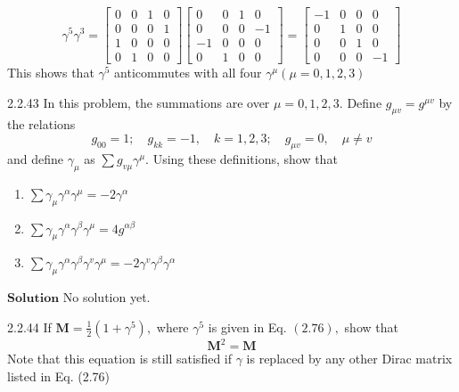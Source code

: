 $$
\gamma^{5} \gamma^{3}=\begin{bmatrix}
0 & 0 & 1 & 0 \\
0 & 0 & 0 & 1 \\
1 & 0 & 0 & 0 \\
0 & 1 & 0 & 0
\end{bmatrix}\begin{bmatrix}
0 & 0 & 1 & 0 \\
0 & 0 & 0 & -1 \\
-1 & 0 & 0 & 0 \\
0 & 1 & 0 & 0
\end{bmatrix}=\begin{bmatrix}
-1 & 0 & 0 & 0 \\
0 & 1 & 0 & 0 \\
0 & 0 & 1 & 0 \\
0 & 0 & 0 & -1
\end{bmatrix}
$$
This shows that $\gamma^{5}$ anticommutes with all four $\gamma^{\mu}(\mu=0,1,2,3)$


\newpage

\begin{mybox}{2.2.43}
In this problem, the summations are over $\mu=0,1,2,3 .$ Define $g_{\mu v}=g^{\mu v}$ by the relations
$$
g_{00}=1 ; \quad g_{k k}=-1, \quad k=1,2,3 ; \quad g_{\mu v}=0, \quad \mu \neq v
$$
and define $\gamma_{\mu}$ as $\sum g_{v \mu} \gamma^{\mu} .$ Using these definitions, show that
\begin{enumerate}[$(a)$]
\item $\sum \gamma_{\mu} \gamma^{\alpha} \gamma^{\mu}=-2 \gamma^{\alpha}$
\item $\sum \gamma_{\mu} \gamma^{\alpha} \gamma^{\beta} \gamma^{\mu}=4 g^{\alpha \beta}$
\item $\sum \gamma_{\mu} \gamma^{\alpha} \gamma^{\beta} \gamma^{v} \gamma^{\mu}=-2 \gamma^{v} \gamma^{\beta} \gamma^{\alpha}$
\end{enumerate}
\end{mybox}

$\boxed{\textbf{Solution}}$ No solution yet.

\newpage

\begin{mybox}{2.2.44}
If $\mathbf{M}=\frac{1}{2}\left(1+\gamma^{5}\right),$ where $\gamma^{5}$ is given in Eq. $(2.76),$ show that
$$
\mathbf{M}^{2}=\mathbf{M}
$$
Note that this equation is still satisfied if $\gamma$ is replaced by any other Dirac matrix listed in Eq. (2.76) 
\end{mybox}


